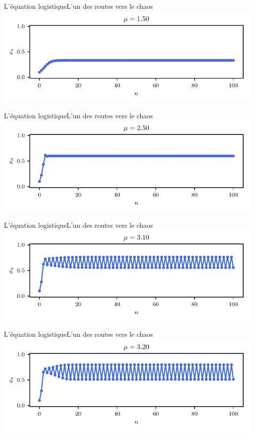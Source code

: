 \documentclass[usenames,dvipsnames,svgnames,10pt,aspectratio=169]{beamer}
\begin{document}
\begin{frame}[t, c]{L'équation logistique}{L'un des routes vers le chaos}
	\centering
	\includegraphics[width=.75\textwidth]{logistic_map_1}
\end{frame}

\begin{frame}[t, c]{L'équation logistique}{L'un des routes vers le chaos}
	\centering
	\includegraphics[width=.75\textwidth]{logistic_map_2}
\end{frame}

\begin{frame}[t, c]{L'équation logistique}{L'un des routes vers le chaos}
	\centering
	\includegraphics[width=.75\textwidth]{logistic_map_3}
\end{frame}

\begin{frame}[t, c]{L'équation logistique}{L'un des routes vers le chaos}
	\centering
	\includegraphics[width=.75\textwidth]{logistic_map_4}
\end{frame}
\end{document}
